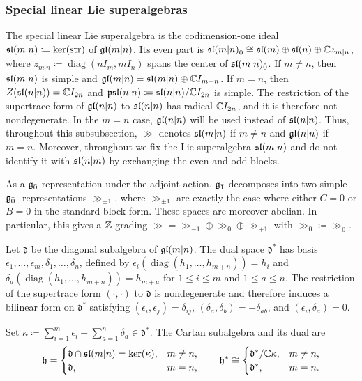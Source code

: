 \subsubsection{Special linear Lie superalgebras}

The special linear Lie superalgebra is the codimension-one ideal $\sl(m\vert n)\coloneqq\ker(\str)$ of $\gl(m\vert n)$. Its even part is $\sl(m\vert n)_{\bar0}\cong\sl(m)\oplus\sl(n)\oplus\CC z_{m\vert n}$, where $z_{m\vert n}\coloneqq\operatorname{diag}(nI_m,mI_n)$ spans the center of $\sl(m\vert n)_{\bar0}$. If $m\neq n$, then $\sl(m\vert n)$ is simple and $\gl(m\vert n)=\sl(m\vert n)\oplus\CC I_{m+n}$. If $m=n$, then $Z(\sl(n\vert n))=\CC I_{2n}$ and $\psl(n\vert n)\coloneqq\sl(n\vert n)/\CC I_{2n}$ is simple. The restriction of the supertrace form of $\gl(n\vert n)$ to $\sl(n\vert n)$ has radical $\CC I_{2n}$, and it is therefore not nondegenerate. In the $m=n$ case, $\gl(n\vert n)$ will be used instead of $\sl(n\vert n)$. Thus, throughout this subsubsection, $\gg$ denotes $\sl(m\vert n)$ if $m\neq n$ and $\gl(n\vert n)$ if $m=n$. Moreover, throughout we fix the Lie superalgebra $\sl(m\vert n)$ and do not identify it with $\sl(n\vert m)$ by exchanging the even and odd blocks.

As a $\even$-representation under the adjoint action, $\odd$ decomposes into two simple $\even$- representations $\gg_{\pm 1}$, where $\gg_{\pm 1}$ are exactly the case where either $C=0$ or $B=0$ in the standard block form. These spaces are moreover abelian. In particular, this gives a $\ZZ$-grading $\gg = \gg_{-1}\oplus \gg_{0}\oplus \gg_{+1}$ with $\gg_{0}\coloneqq \gg_{\bar{0}}$. 

Let $\mathfrak d$ be the diagonal subalgebra of $\gl(m\vert n)$. The dual space $\mathfrak d^{\ast}$ has basis $\epsilon_1,\ldots,\epsilon_m,\delta_1,\ldots,\delta_n$, defined by $\epsilon_i(\operatorname{diag}(h_1,\ldots,h_{m+n}))=h_i$ and $\delta_a(\operatorname{diag}(h_1,\ldots,h_{m+n}))=h_{m+a}$ for $1\leq i\leq m$ and $1\leq a\leq n$. The restriction of the supertrace form $(\cdot,\cdot)$ to $\mathfrak{d}$ is nondegenerate and therefore induces a bilinear form on $\mathfrak d^{\ast}$ satisfying $(\epsilon_i,\epsilon_j)=\delta_{ij}$, $(\delta_a,\delta_b)=-\delta_{ab}$, and $(\epsilon_i,\delta_a)=0$.

Set $\kappa\coloneqq\sum_{i=1}^m\epsilon_i-\sum_{a=1}^n\delta_a\in \mathfrak{d}^{\ast}$. The Cartan subalgebra and its dual are
\begin{equation}
\hh=
\begin{cases}
\mathfrak d\cap\sl(m\vert n)=\ker(\kappa),&m\neq n,\\
\mathfrak d,&m=n,
\end{cases}
\qquad
\hh^{\ast}\cong
\begin{cases}
\mathfrak d^{\ast}/\CC \kappa,&m\neq n,\\
\mathfrak d^{\ast},&m=n.
\end{cases}
\end{equation}

